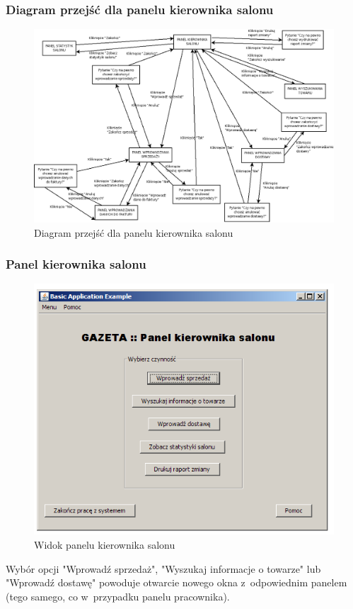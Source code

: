 \subsubsection{Diagram przejść dla panelu kierownika salonu}
\begin{figure}[h]
\begin{center}
\includegraphics[width=15cm,angle=90,keepaspectratio]{gfx/przejscia_kierownik.png}
\caption{Diagram przejść dla panelu kierownika salonu}
\end{center}
\end{figure}
\clearpage
\subsubsection{Panel kierownika salonu}
\begin{figure}[h]
\includegraphics[width=1\textwidth]{gfx/kierownik.png}
\caption{Widok panelu kierownika salonu}
\end{figure}
Wybór opcji "Wprowadź sprzedaż", "Wyszukaj informacje o towarze" lub "Wprowadź dostawę" powoduje otwarcie nowego okna z~odpowiednim panelem (tego samego, co w~przypadku panelu pracownika).

